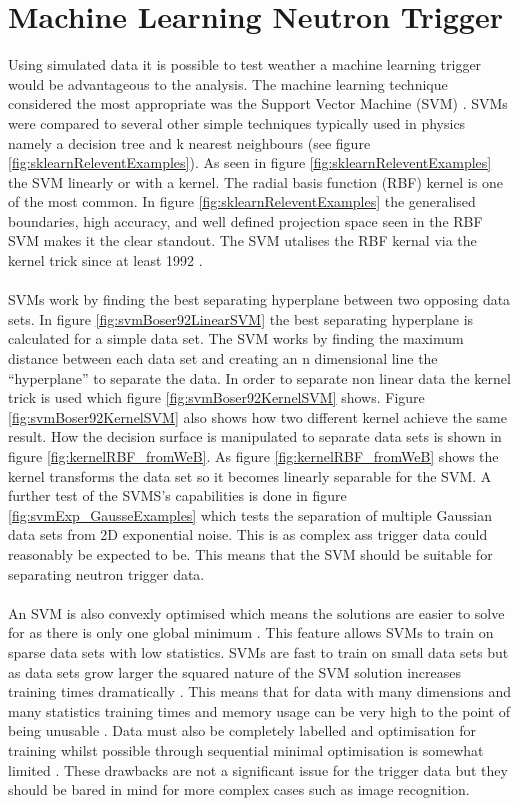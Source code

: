 \section{Machine Learning Neutron Trigger}\label{sec:MachineLearningTrigger}
Using simulated data it is possible to test weather a machine learning trigger would be advantageous to the analysis. The machine learning technique considered the most appropriate was the Support Vector Machine (SVM) \cite{Boser92atraining} \cite{cortes1995support}. SVMs were compared to several other simple techniques typically used in physics namely a decision tree and k nearest neighbours (see figure \ref{fig:sklearnReleventExamples}). As seen in figure \ref{fig:sklearnReleventExamples} the SVM linearly or with a kernel. The radial basis function (RBF) kernel is one of the most common. In figure \ref{fig:sklearnReleventExamples} the generalised boundaries, high accuracy, and well defined projection space seen in the RBF SVM makes it the clear standout. The SVM utalises the RBF kernal via the kernel trick since at least 1992 \cite{Boser92atraining}. 
\\\\SVMs work by finding the best separating hyperplane between two opposing data sets. In figure \ref{fig:svmBoser92LinearSVM} the best separating hyperplane is calculated for a simple data set. The SVM works by finding the maximum distance between each data set and creating an n dimensional line the ``hyperplane'' to separate the data. In order to separate non linear data the kernel trick is used which figure \ref{fig:svmBoser92KernelSVM} shows. Figure \ref{fig:svmBoser92KernelSVM} also shows how two different kernel achieve the same result. How the decision surface is manipulated to separate data sets is shown in figure \ref{fig:kernelRBF_fromWeB}. As figure \ref{fig:kernelRBF_fromWeB} shows the kernel transforms the data set so it becomes linearly separable for the SVM. A further test of the SVMS's capabilities is done in figure \ref{fig:svmExp_GausseExamples} which tests the separation of multiple Gaussian data sets from 2D exponential noise. This is as complex ass trigger data could reasonably be expected to be. This means that the SVM should be suitable for separating neutron trigger data. 
\\\\An SVM is also convexly optimised which means the solutions are easier to solve for as there is only one global minimum \cite{cortes1995support}. This feature allows SVMs to train on sparse data sets with low statistics. SVMs are fast to train on small data sets but as data sets grow larger the squared nature of the SVM solution increases training times dramatically \cite{cortes1995support}. This means that for data with many dimensions and many statistics training times and memory usage can be very high to the point of being unusable \cite{cortes1995support}. Data must also be completely labelled and optimisation for training whilst possible through sequential minimal optimisation is somewhat limited \cite{platt1998sequential}. These drawbacks are not a significant issue for the trigger data but they should be bared in mind for more complex cases such as image recognition.
 
